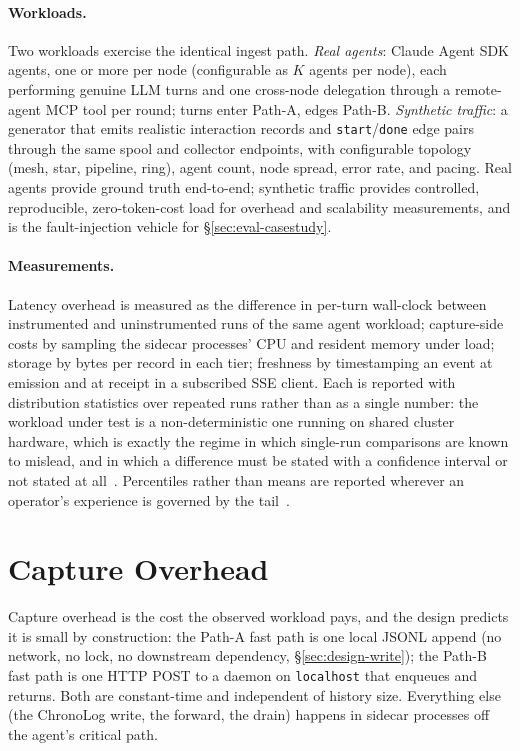 \paragraph{Workloads.} Two workloads exercise the identical ingest path.
\emph{Real agents}: Claude Agent SDK agents, one or more per node
(configurable as $K$ agents per node), each performing genuine LLM turns
and one cross-node delegation through a remote-agent MCP tool per
round; turns enter Path-A, edges Path-B. \emph{Synthetic traffic}: a
generator that emits realistic interaction records and
\texttt{start}/\texttt{done} edge pairs through the same spool and
collector endpoints, with configurable topology (mesh, star, pipeline,
ring), agent count, node spread, error rate, and pacing. Real agents
provide ground truth end-to-end; synthetic traffic provides controlled,
reproducible, zero-token-cost load for overhead and scalability
measurements, and is the fault-injection vehicle for
\S\ref{sec:eval-casestudy}.

\paragraph{Measurements.} Latency overhead is measured as the difference
in per-turn wall-clock between instrumented and uninstrumented runs of
the same agent workload; capture-side costs by sampling the sidecar
processes' CPU and resident memory under load; storage by bytes per
record in each tier; freshness by timestamping an event at emission and
at receipt in a subscribed SSE client. Each is reported with distribution
statistics over repeated runs rather than as a single number: the workload
under test is a non-deterministic one running on shared cluster hardware,
which is exactly the regime in which single-run comparisons are known to
mislead, and in which a difference must be stated with a confidence
interval or not stated at all~\cite{georges2007rigorous}. Percentiles
rather than means are reported wherever an operator's experience is
governed by the tail~\cite{dean2013tail}.

\section{Capture Overhead}
\label{sec:eval-overhead}

Capture overhead is the cost the observed workload pays, and the design
predicts it is small by construction: the Path-A fast path is one local
JSONL append (no network, no lock, no downstream dependency,
\S\ref{sec:design-write}); the Path-B fast path is one HTTP POST to a
daemon on \texttt{localhost} that enqueues and returns. Both are
constant-time and independent of history size. Everything else (the
ChronoLog write, the forward, the drain) happens in sidecar processes
off the agent's critical path.

